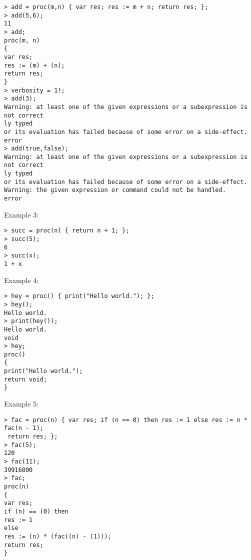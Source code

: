 \begin{center}\begin{minipage}{15cm}\begin{Verbatim}[frame=single,commandchars=\\\|\~]
> add = proc(m,n) { var res; res := m + n; return res; };
> add(5,6);
11
> add;
proc(m, n)
{
var res;
res := (m) + (n);
return res;
}
> verbosity = 1!;
> add(3);
Warning: at least one of the given expressions or a subexpression is not correct
ly typed
or its evaluation has failed because of some error on a side-effect.
error
> add(true,false);
Warning: at least one of the given expressions or a subexpression is not correct
ly typed
or its evaluation has failed because of some error on a side-effect.
Warning: the given expression or command could not be handled.
error
\end{Verbatim}
\end{minipage}\end{center}
\noindent Example 3: 
\begin{center}\begin{minipage}{15cm}\begin{Verbatim}[frame=single,commandchars=\\\|\~]
> succ = proc(n) { return n + 1; };
> succ(5);
6
> succ(x);
1 + x
\end{Verbatim}
\end{minipage}\end{center}
\noindent Example 4: 
\begin{center}\begin{minipage}{15cm}\begin{Verbatim}[frame=single,commandchars=\\\|\~]
> hey = proc() { print("Hello world."); };
> hey();
Hello world.
> print(hey());
Hello world.
void
> hey;
proc()
{
print("Hello world.");
return void;
}
\end{Verbatim}
\end{minipage}\end{center}
\noindent Example 5: 
\begin{center}\begin{minipage}{15cm}\begin{Verbatim}[frame=single,commandchars=\\\|\~]
> fac = proc(n) { var res; if (n == 0) then res := 1 else res := n * fac(n - 1);
 return res; };
> fac(5);
120
> fac(11);
39916800
> fac;
proc(n)
{
var res;
if (n) == (0) then
res := 1
else
res := (n) * (fac((n) - (1)));
return res;
}
\end{Verbatim}
\end{minipage}\end{center}
